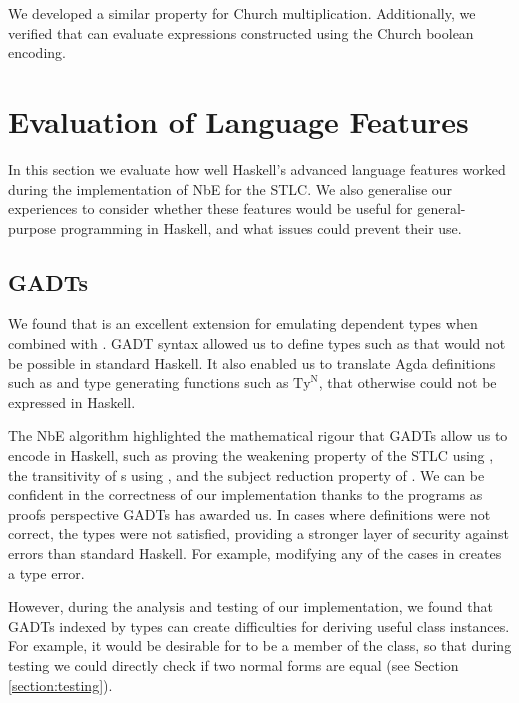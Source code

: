 We developed a similar property for Church multiplication. Additionally, we verified that  can evaluate expressions constructed using the Church boolean encoding.

\section{Evaluation of Language Features}

In this section we evaluate how well Haskell's advanced language features worked during the implementation of NbE for the STLC. We also generalise our experiences to consider whether these features would be useful for general-purpose programming in Haskell, and what issues could prevent their use.

\subsection{GADTs}
\label{subsect:GADTanalysis}

We found that  is an excellent extension for emulating dependent types when combined with . GADT syntax allowed us to define types such as  that would not be possible in standard Haskell. It also enabled us to translate Agda  definitions such as  and type generating functions such as $\text{Ty}^\text{N}$, that otherwise could not be expressed in Haskell. 

The NbE algorithm highlighted the mathematical rigour that GADTs allow us to encode in Haskell, such as proving the weakening property of the STLC using , the transitivity of s using , and the subject reduction property of . We can be confident in the correctness of our implementation thanks to the programs as proofs perspective GADTs has awarded us. In cases where definitions were not correct, the types were not satisfied, providing a stronger layer of security against errors than standard Haskell. For example, modifying any of the cases in  creates a type error.

However, during the analysis and testing of our implementation, we found that GADTs indexed by types can create difficulties for deriving useful class instances. For example, it would be desirable for  to be a member of the  class, so that during testing we could directly check if two normal forms are equal (see Section \ref{section:testing}). 

